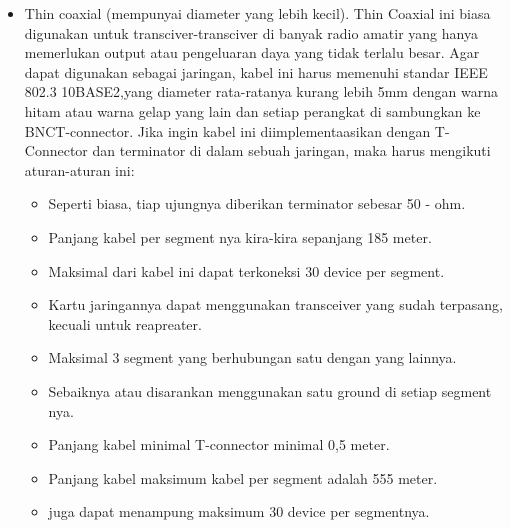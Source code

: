 \begin{itemize}
		\item Thin coaxial (mempunyai diameter yang lebih kecil). Thin Coaxial ini biasa digunakan untuk transciver-transciver di banyak radio amatir yang hanya memerlukan output atau pengeluaran daya yang tidak terlalu besar. Agar dapat digunakan sebagai jaringan, kabel ini harus memenuhi standar IEEE 802.3 10BASE2,yang diameter rata-ratanya kurang lebih 5mm dengan warna hitam atau warna gelap yang lain dan setiap perangkat di sambungkan ke BNCT-connector. Jika ingin kabel ini diimplementaasikan dengan T-Connector dan terminator di dalam sebuah jaringan, maka harus mengikuti aturan-aturan ini: 
			\begin{itemize}
				\item Seperti biasa, tiap ujungnya diberikan terminator sebesar 50 - ohm.
				\item Panjang kabel per segment nya kira-kira sepanjang 185 meter.
				\item Maksimal dari kabel ini dapat terkoneksi 30 device per segment.
				\item Kartu jaringannya dapat menggunakan transceiver yang sudah terpasang, kecuali untuk reapreater.
				\item Maksimal 3 segment yang berhubungan satu dengan yang lainnya.
				\item Sebaiknya atau disarankan menggunakan satu ground di setiap segment nya.
				\item Panjang kabel minimal T-connector minimal 0,5 meter.
				\item Panjang kabel maksimum kabel per segment adalah 555 meter.
				\item juga dapat menampung maksimum 30 device per segmentnya.
			\end{itemize}
			
	\end{itemize}

